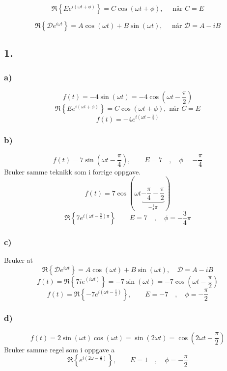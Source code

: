 \documentclass{article}
\begin{document}
\begin{equation}\label{eq: con_3}
  \mathfrak{R} \left\{ E e^{i(ωt + ϕ)} \right\} = C \cos (ωt + ϕ), \quad \text{ når } C = E
\end{equation}

\begin{equation}\label{eq: con_4}
  \mathfrak{R} \left\{ 𝒟 e^{iωt} \right\} = A \cos (ωt) + B\sin (ωt), \quad \text{ når } 𝒟 = A - iB
\end{equation}
\subsection*{1.}
\subsubsection*{a)}
\[
f(t) = -4\sin (ωt) = -4 \cos(ωt - \frac{\pi}{2})
\]
\[
\mathfrak{R} \left\{ E e^{i(ωt + ϕ)} \right\} = C \cos (ωt + ϕ), \text{ når } C = E
\]
\[
f(t) = -4 e^{i \left( ωt - \frac{π}{2} \right) }
\]
\subsubsection*{b)}
\[
f(t) = 7 \sin \left( ωt - \frac{π}{4} \right) , \qquad E = 7 \quad , \quad ϕ = - \frac{π}{4}
\]
Bruker samme teknikk som i forrige oppgave. 
\[
f(t) = 7 \cos  \left( ωt \underbrace{- \frac{π}{4} - \frac{π}{2}}_{-\frac{3}{4}π} \right)
\]
\[
\mathfrak{R} \left\{ 7 e^{i\left( ωt - \frac{3}{4} \right) π} \right\} \qquad E = 7 \quad , \quad ϕ = - \frac{3}{4}π
\]
\subsubsection*{c)}
Bruker at 
\[
\mathfrak{R} \left\{ 𝒟 e^{iωt} \right\} = A\cos (ωt) + B\sin (ωt) , \quad 𝒟 = A - iB 
\]
\[
f(t) = \mathfrak{R} \left\{ 7ie^{\left( iωt \right) } \right\} = -7\sin (ωt) = -7\cos (ωt - \frac{π}{2}) 
\]
\[
f(t) = \mathfrak{R} \left\{ -7e^{i \left( ωt - \frac{π}{2} \right) } \right\} , \qquad E = -7 \quad , \quad ϕ = - \frac{π}{2}
\]

\subsubsection*{d)}
\[
f(t) = 2 \sin (ωt) \cos (ωt) = \sin (2ωt) = \cos \left( 2ωt - \frac{π}{2} \right)
\]
Bruker samme regel som i oppgave a
\[
\mathfrak{R} \left\{ e^{i \left( 2ω - \frac{π}{2} \right) } \right\}, \qquad E = 1 \quad , \quad ϕ = - \frac{π}{2}
\]
\end{document}
